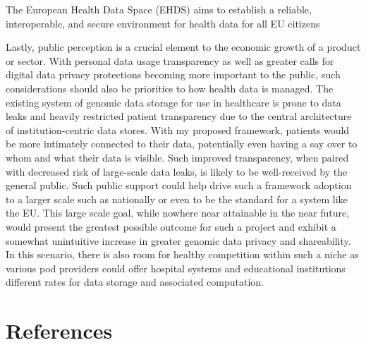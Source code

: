 \documentclass[a4paper,11pt]{article}
\begin{document}
\begin{refsection}
The European Health Data Space (EHDS) aims to establish a reliable, interoperable, and secure environment for health data for all EU citizens~\cite{EHDS_2022}

Lastly, public perception is a crucial element to the economic growth of a product or sector. 
With personal data usage transparency as well as greater calls for digital data privacy protections becoming more important to the public, such considerations should also be priorities to how health data is managed. 
The existing system of genomic data storage for use in healthcare is prone to data leaks and heavily restricted patient transparency due to the central architecture of institution-centric data stores. 
With my proposed framework, patients would be more intimately connected to their data, potentially even having a say over to whom and what their data is visible. 
Such improved transparency, when paired with decreased risk of large-scale data leaks, is likely to be well-received by the general public. 
Such public support could help drive such a framework adoption to a larger scale such as nationally or even to be the standard for a system like the EU. 
This large scale goal, while nowhere near attainable in the near future, would present the greatest possible outcome for such a project and exhibit a somewhat unintuitive increase in greater genomic data privacy and shareability. 
In this scenario, there is also room for healthy competition within such a niche as various pod providers could offer hospital systems and educational institutions different rates for data storage and associated computation.


\section{References}
\smallskip
\printbibliography[heading=none]


\end{refsection}
\end{document}
